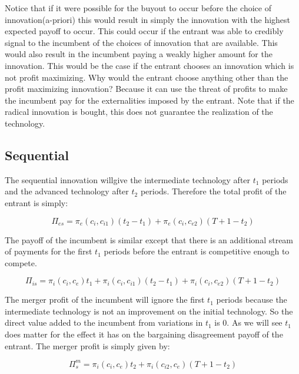 \documentclass[11pt]{article}
\begin{document}
Notice that if it were possible for the buyout to occur before the choice of innovation(a-priori) this would result in simply the innovation with the highest expected payoff to occur. This could occur if the entrant was able to credibly signal to the incumbent of the choices of innovation that are available. This would also result in the incumbent paying a weakly higher amount for the innovation. This would be the case if the entrant chooses an innovation which is not profit maximizing. Why would the entrant choose anything other than the profit maximizing innovation? Because it can use the threat of profits to make the incumbent pay for the externalities imposed by the entrant. Note that if the radical innovation is bought, this does not guarantee the realization of the technology. 

\subsection{Sequential}

The sequential innovation willgive the intermediate technology after $t_1$ periods and the advanced technology after $t_2$ periods. Therefore the total profit of the entrant is simply: 

\begin{equation*}
\Pi_{es} = \pi_e(c_i,c_{i1}) (t_2-t_1) +\pi_e(c_i,c_{e2})(T+1-t_2)
\end{equation*}

The payoff of the incumbent is similar except that there is an additional stream of payments for the first $t_1$ periods before the entrant is competitive enough to compete. 

\begin{equation*}
\Pi_{is} = \pi_i(c_i,c_{e})t_1+\pi_i(c_i,c_{i1}) (t_2-t_1)+\pi_i(c_i,c_{e2})(T+1-t_2)
\end{equation*}

The merger profit of the incumbent will ignore the first $t_1$ periods because the intermediate technology is not an improvement on the initial technology. So the direct value added to the incumbent from variations in $t_1$ is 0. As we will see $t_1$ does matter for the effect it has on the bargaining disagreement payoff of the entrant. The merger profit is simply given by: 

\begin{equation*}
\Pi_{s}^m= \pi_i(c_i,c_{e}) t_2+\pi_i(c_{i2},c_e)(T+1-t_2)
\end{equation*}
\end{document}
